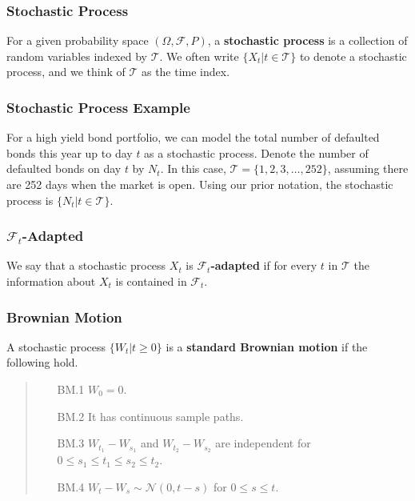 \documentclass{beamer}
\begin{document}
\begin{frame}
\frametitle{Stochastic Process}

\begin{Definition}
For a given probability space $(\Omega, \mathcal{F}, P)$, a {\bf stochastic process} is a collection of random variables indexed by $\mathcal{T}$. We often write $\{X_t | t \in\mathcal{T}\}$ to denote a stochastic process, and we think of $\mathcal{T}$ as the time index.
\end{Definition}
\end{frame}

\begin{frame}
\frametitle{Stochastic Process Example}

\begin{Example}
For a high yield bond portfolio, we can model the total number of defaulted bonds this year up to day $t$ as a stochastic process. Denote the number of defaulted bonds on day $t$ by $N_t$. In this case, $\mathcal{T} = \{1, 2, 3,\ldots, 252\}$, assuming there are 252 days when the market is open. Using our prior notation, the stochastic process is $\{N_t | t\in\mathcal{T}\}$.
\end{Example}

\end{frame}

\begin{frame}

\frametitle{$\mathcal{F}_t$-Adapted}
\begin{Definition}
We say that a stochastic process $X_t$ is $\mathcal{F}_t${\bf-adapted} if for every $t$ in $\mathcal{T}$ the information about $X_t$ is contained in $\mathcal{F}_t$.
\end{Definition}
\end{frame}

\begin{frame}
\frametitle{Brownian Motion}
\begin{Definition}
A stochastic process $\{W_t | t\geq 0\}$ is a {\bf standard Brownian motion} if the following hold.
\medskip

\begin{quote}
\begin{enumerate}
\item[BM.1] $W_0 = 0$.
\item[BM.2] It has continuous sample paths.
\item[BM.3] $W_{t_1} - W_{s_1}$ and $W_{t_2} - W_{s_2}$ are independent for $0\leq s_1 \leq t_1 \leq s_2 \leq t_2$.
\item[BM.4] $W_t - W_s \sim{\mathcal{N}(0, t - s)}$ for $0\leq s \leq t$.
\end{enumerate}
\end{quote}
\end{Definition}
\end{frame}
\end{document}
